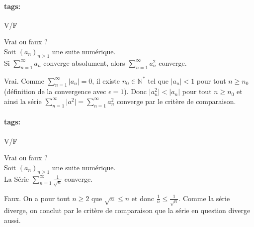 \documentclass[12pt]{article}
\newcommand*{\xfield}[1]{\begin{mdframed}\centering #1\end{mdframed}\bigskip}
\newenvironment{note}{}{}
\newcommand*{\tags}[1]{\paragraph{tags: }#1}
\begin{document}
\begin{note}
\tags{V/F}
	\xfield{Vrai ou faux ?\\
	Soit $(a_n)_{n\ge 1}$ une suite numérique.\\
	Si $\sum\limits^{\infty}_{n=1} a_n$ converge absolument, alors $\sum\limits^{\infty}_{n=1} a^2_n$ converge.}
	\xfield{Vrai. Comme $\sum\limits^{\infty}_{n=1} \vert a_n \vert = 0$, il existe $n_0 \in \mathbb{N}^*$ tel que $\vert a_n\vert < 1$ pour tout $n \ge n_0$ (définition de la convergence avec $\epsilon = 1$). Donc $\vert a_n^2\vert < \vert a_n \vert$ pour tout $n\ge n_0$ et ainsi la série $\sum\limits^{\infty}_{n=1} \vert a^2\vert = \sum\limits^{\infty}_{n=1} a^2_n$ converge par le critère de comparaison.}
\end{note}

\begin{note}
\tags{V/F}
	\xfield{Vrai ou faux ?\\
	Soit $(a_n)_{n\ge 1}$ une suite numérique.\\
	La Série $\sum\limits^{\infty}_{n=1} \frac{1}{\sqrt{n}}$ converge.}
	\xfield{Faux. On a pour tout $n \ge 2$ que $\sqrt{n} \le n$ et donc $\frac{1}{n} \le \frac{1}{\sqrt{n}}$. Comme la série diverge, on conclut par le critère de comparaison que la série en question diverge aussi.}
\end{note}
\end{document}
